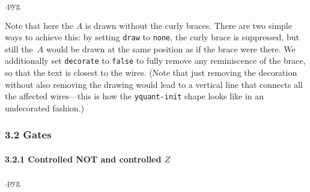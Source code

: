 \documentclass{scrartcl}
\makeatletter
\newenvironment{codeexample}{%
   \VerbatimEnvironment%
   \let\FVB@VerbatimOut\minted@FVB@VerbatimOut
   \let\FVE@VerbatimOut\minted@FVE@VerbatimOut
   \minted@configlang{tex}%
   \minted@fvset
   \begin{VerbatimOut}[codes={\catcode`\^^I=12},firstline,lastline]{\minted@jobname.pyg}%
}{
   \end{VerbatimOut}%
   \minted@langlinenoson%
   \savebox\codeexamplebox{ \minted@jobname.pyg}%
   \ifdim\wd\codeexamplebox>\dimexpr.5\linewidth-3mm\relax%
      \wd\codeexamplebox=.5\linewidth%
   \else%
      \wd\codeexamplebox=\dimexpr\wd\codeexamplebox+3mm\relax%
   \fi%
   \noindent\begin{minipage}{\wd\codeexamplebox}%
      \centering%
      \usebox\codeexamplebox%
   \end{minipage}%
   \begin{minipage}{\dimexpr\linewidth-\wd\codeexamplebox\relax}%
      \expandafter\minted@pygmentize\expandafter{\minted@lang}%
   \end{minipage}%
   \minted@langlinenosoff%
   \par%
}
\makeatother
\begin{document}
               \begin{example}
                  \begin{codeexample}
                  \end{codeexample}
                  Note that here the $A$ is drawn without the curly braces.
                  There are two simple ways to achieve this: by setting \texttt{draw} to \texttt{none}, the curly brace is suppressed, but still the~$A$ would be drawn at the same position as if the brace were there.
                  We additionally set \texttt{decorate} to \texttt{false} to fully remove any reminiscence of the brace, so that the text is closest to the wires.
                  (Note that just removing the decoration without also removing the drawing would lead to a vertical line that connects all the affected wires---this is how the \texttt{yquant-init} shape looks like in an undecorated fashion.)
               \end{example}

         \subsubsection{3.2 Gates}
            \paragraph{3.2.1 Controlled NOT and controlled \texorpdfstring{$Z$}{Z}}
               \begin{example}
                  \begin{codeexample}
                  \end{codeexample}
               \end{example}
\end{document}
